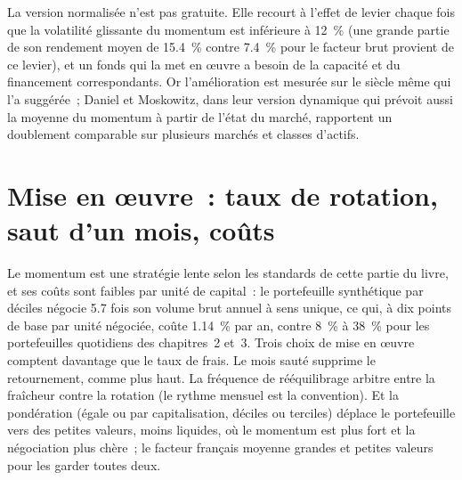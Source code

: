 \begin{omfigure}

\label{fig:s1:momentum:annual}
\end{omfigure}

La version normalisée n'est pas gratuite. Elle recourt à l'effet de levier chaque fois que la volatilité glissante du momentum est inférieure à 12~\% (une grande partie de son rendement moyen de 15.4~\%
contre 7.4~\% pour le facteur brut provient de ce levier), et un fonds qui la met en œuvre a besoin de la capacité et du financement correspondants. Or l'amélioration est mesurée sur le siècle même qui l'a suggérée~; Daniel et
Moskowitz, dans leur version dynamique qui prévoit aussi la moyenne du momentum à partir de l'état du marché, rapportent un doublement comparable sur plusieurs marchés et classes d'actifs.

\section{Mise en œuvre~: taux de rotation, saut d'un mois, coûts}

Le momentum est une stratégie lente selon les standards de cette partie du livre, et ses coûts sont faibles par unité de capital~: le portefeuille synthétique par déciles négocie 5.7 fois
son volume brut annuel à sens unique, ce qui, à dix points de base par unité négociée, coûte 1.14~\% par an, contre 8~\% à 38~\% pour les portefeuilles quotidiens des chapitres~2 et~3. Trois
choix de mise en œuvre comptent davantage que le taux de frais. Le mois sauté supprime le retournement, comme plus haut. La fréquence de rééquilibrage arbitre entre la fraîcheur
contre la rotation (le rythme mensuel est la convention). Et la pondération (égale ou par capitalisation, déciles ou terciles) déplace le portefeuille vers des petites valeurs, moins liquides,
où le momentum est plus fort et la négociation plus chère~; le facteur français moyenne grandes et petites valeurs pour les garder toutes deux.

